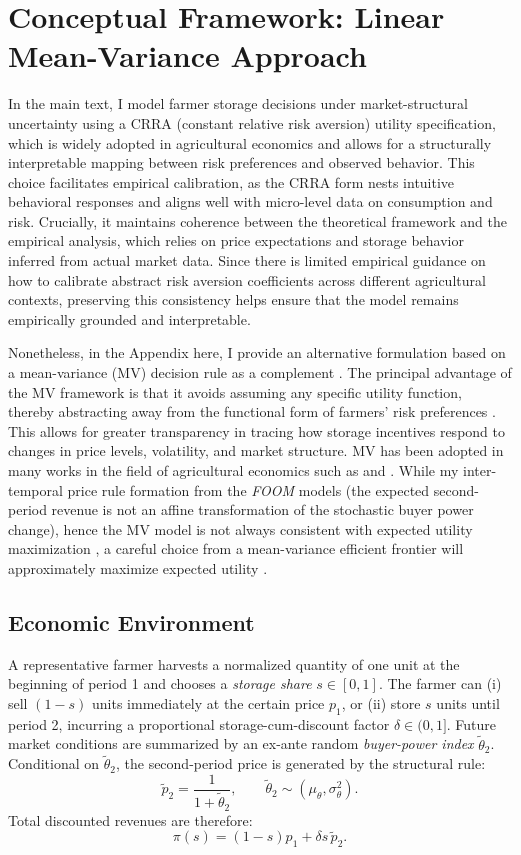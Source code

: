 \section{Conceptual Framework: Linear Mean-Variance Approach} \label{Appendix: mean-variance approach}
\noindent In the main text, I model farmer storage decisions under market-structural uncertainty using a CRRA (constant relative risk aversion) utility specification, which is widely adopted in agricultural economics and allows for a structurally interpretable mapping between risk preferences and observed behavior. This choice facilitates empirical calibration, as the CRRA form nests intuitive behavioral responses and aligns well with micro-level data on consumption and risk. Crucially, it maintains coherence between the theoretical framework and the empirical analysis, which relies on price expectations and storage behavior inferred from actual market data. Since there is limited empirical guidance on how to calibrate abstract risk aversion coefficients across different agricultural contexts, preserving this consistency helps ensure that the model remains empirically grounded and interpretable.

Nonetheless, in the Appendix here, I provide an alternative formulation based on a mean-variance (MV) decision rule as a complement \citep{levy1979approximating, schoemaker1982expected}. The principal advantage of the MV framework is that it avoids assuming any specific utility function, thereby abstracting away from the functional form of farmers' risk preferences \citep{coyle1992risk}. This allows for greater transparency in tracing how storage incentives respond to changes in price levels, volatility, and market structure. MV has been adopted in many works in the field of agricultural economics such as \cite{saitone2009optimal} and \cite{yu2018effects}. While my inter-temporal price rule formation from the \textit{FOOM} models (the expected second-period revenue is not an affine transformation of the stochastic buyer power change), hence the MV model is not always consistent with expected utility maximization \citep{meyer1987two}, a careful choice from a mean-variance efficient frontier will approximately maximize expected utility \citep{markowitz2014mean, chiu2016supply}.




\subsection{Economic Environment}
\noindent
A representative farmer harvests a normalized quantity of one unit at the beginning of period 1 and chooses a \textit{storage share} \(s\in[0,1]\). The farmer can (i) sell \((1-s)\) units immediately at the certain price \(p_{1}\), or (ii) store \(s\) units until period 2, incurring a proportional storage-cum-discount factor \(\delta\in(0,1]\). Future market conditions are summarized by an ex-ante random \textit{buyer-power index} \(\tilde\theta_{2}\). Conditional on \(\tilde\theta_{2}\), the second-period price is generated by the structural rule:
$$
\tilde p_{2} = \frac{1}{1+\tilde\theta_{2}}, \qquad 
\tilde\theta_{2} \sim (\mu_\theta, \sigma_\theta^{2}).
$$
Total discounted revenues are therefore:
$$
\pi(s) = (1-s)p_{1} + \delta s\,\tilde p_{2}.
$$

